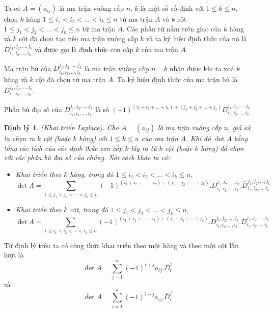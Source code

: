 \documentclass[12pt,a4paper]{report}
\newtheorem{dl}{Định lý}
\begin{document}
Ta có $A = (a_{ij})$ là ma trận vuông cấp $n$, $k$ là một số cố định với $1 \leq k \leq n$, chọn $k$ hàng $1 \leq i_1 < i_2 < \ldots < i_k \leq n$ từ ma trận $A$ và $k$ cột $1 \leq j_1 < j_2 < \ldots < j_k \leq n$ từ ma trận $A$. Các phần từ nằm trên giao của $k$ hàng và $k$ cột đã chọn tạo nên ma trận vuông cấp $k$ và ta ký hiệu định thức của nó là $D_{i_1,i_2,\ldots,i_k}^{j_1,j_2,\ldots,j_k}$ và được gọi là định thức con cấp $k$ của ma trận $A$.

Ma trận bù của $D_{i_1,i_2,\ldots,i_k}^{j_1,j_2,\ldots,j_k}$ là ma trận vuông cấp $n-k$ nhận được khi ta xoá $k$ hàng và $k$ cột đã chọn từ ma trận $A$. Ta ký hiệu định thức của ma trận bù là $\overline{D}_{i_1,i_2,\ldots,i_k}^{j_1,j_2,\ldots,j_k}$.

Phần bù đại số của $D_{i_1,i_2,\ldots,i_k}^{j_1,j_2,\ldots,j_k}$ là số $(-1)^{(i_1+i_2+\ldots+i_k) + (j_1+j_2+\ldots+j_k)} \overline{D}_{i_1,i_2,\ldots,i_k}^{j_1,j_2,\ldots,j_k}$

\begin{dl}{(Khai triển Laplace).} \label{ktrienlaplace}
Cho $A= (a_{ij})$ là ma trận vuông cấp $n$, giả sử ta chọn ra $k$ cột (hoặc $k$ hàng) với $1 \leq k \leq n$ của ma trận $A$. Khi đó $\det A$ bằng tổng các tích của các định thức con cấp $k$ lấy ra từ $k$ cột (hoặc $k$ hàng) đã chọn với các phần bù đại số của chúng. Nói cách khác ta có:
\begin{itemize}
\item Khai triển theo $k$ hàng, trong đó $1 \leq i_1 < i_2 < \ldots < i_k \leq n$,
\begin{equation*}
    \det A = \sum _{1 \leq j_1 < j_2 < \cdots < j_k \leq n} (-1)^{(i_1+i_2+\ldots+i_k) + (j_1+j_2+\ldots+j_k)} . D_{i_1,i_2,\ldots,i_k}^{j_1,j_2,\ldots,j_k} . \overline{D}_{i_1,i_2,\ldots,i_k}^{j_1,j_2,\ldots,j_k}
\end{equation*}
\item Khai triển theo $k$ cột, trong đó $1 \leq j_1 < j_2 < \ldots < j_k \leq n$,
\begin{equation*}
    \det A = \sum _{1 \leq i_1 < i_2 < \cdots < i_k \leq n} (-1)^{(i_1+i_2+\ldots+i_k) + (j_1+j_2+\ldots+j_k)} . D_{i_1,i_2,\ldots,i_k}^{j_1,j_2,\ldots,j_k} . \overline{D}_{i_1,i_2,\ldots,i_k}^{j_1,j_2,\ldots,j_k}
\end{equation*}
\end{itemize}
\end{dl}

Từ định lý trên ta có công thức khai triển theo một hàng và theo một cột lần lượt là
\begin{equation}
\det A = \sum_{j=1}^n (-1)^{i+j}a_{ij} . \overline{D}_i^j
\end{equation}
và
\begin{equation}
\det A = \sum_{i=1}^n (-1)^{i+j}a_{ij} . \overline{D}_i^j
\end{equation}
\end{document}
